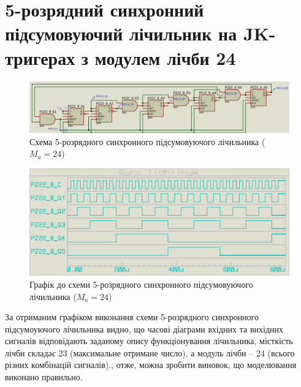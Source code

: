 \documentclass{article}
\begin{document}
\begin{normalsize}
	\begin{figure}[H]
		\centering
	\end{figure}

	\section*{5-розрядний синхронний підсумовуючий лічильник на JK-тригерах з модулем лічби 24}	
	\begin{figure}[H]
		\centering
		\includegraphics[scale=0.25]{s6}	
		\caption{Схема 5-розрядного синхронного підсумовуючого лічильника ($M_a=24$)}
	\end{figure}
	
	\begin{figure}[H]
		\centering
		\includegraphics[scale=0.25]{g6}	
		\caption{Графік до схеми 5-розрядного синхронного підсумовуючого лічильника ($M_a=24$)}
	\end{figure}

За отриманим графіком виконання схеми 5-розрядного синхронного підсумоуючого лічильника  видно, що часові діаграми вхідних та вихідних сигналів відповідають заданому опису функціонування лічильника, місткість лічби складає 23 (максимальне отримане число), а модуль лічби – 24 (всього різних комбінацій сигналів)., отже, можна зробити виновок, що моделювання виконано правильно. 
	

\end{normalsize}
\end{document}
